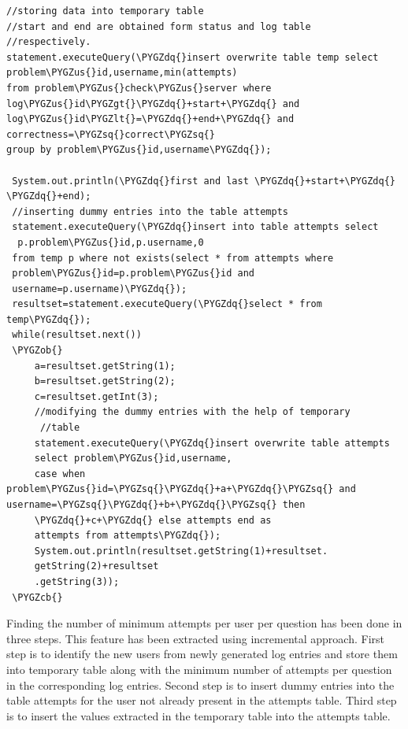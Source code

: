 \documentclass[a4paper,12pt,oneside]{sphinxmanual}
\def\PYGZus{\char`\_}
\def\PYGZob{\char`\{}
\def\PYGZcb{\char`\}}
\def\PYGZlt{\char`\<}
\def\PYGZgt{\char`\>}
\def\PYGZsq{\char`\'}
\def\PYGZdq{\char`\"}
\begin{document}
\begin{Verbatim}[commandchars=\\\{\}]
//storing data into temporary table
//start and end are obtained form status and log table
//respectively.
statement.executeQuery(\PYGZdq{}insert overwrite table temp select
problem\PYGZus{}id,username,min(attempts)
from problem\PYGZus{}check\PYGZus{}server where log\PYGZus{}id\PYGZgt{}\PYGZdq{}+start+\PYGZdq{} and
log\PYGZus{}id\PYGZlt{}=\PYGZdq{}+end+\PYGZdq{} and correctness=\PYGZsq{}correct\PYGZsq{}
group by problem\PYGZus{}id,username\PYGZdq{});

 System.out.println(\PYGZdq{}first and last \PYGZdq{}+start+\PYGZdq{} \PYGZdq{}+end);
 //inserting dummy entries into the table attempts
 statement.executeQuery(\PYGZdq{}insert into table attempts select
  p.problem\PYGZus{}id,p.username,0
 from temp p where not exists(select * from attempts where
 problem\PYGZus{}id=p.problem\PYGZus{}id and
 username=p.username)\PYGZdq{});
 resultset=statement.executeQuery(\PYGZdq{}select * from temp\PYGZdq{});
 while(resultset.next())
 \PYGZob{}
     a=resultset.getString(1);
     b=resultset.getString(2);
     c=resultset.getInt(3);
     //modifying the dummy entries with the help of temporary
      //table
     statement.executeQuery(\PYGZdq{}insert overwrite table attempts
     select problem\PYGZus{}id,username,
     case when problem\PYGZus{}id=\PYGZsq{}\PYGZdq{}+a+\PYGZdq{}\PYGZsq{} and username=\PYGZsq{}\PYGZdq{}+b+\PYGZdq{}\PYGZsq{} then
     \PYGZdq{}+c+\PYGZdq{} else attempts end as
     attempts from attempts\PYGZdq{});
     System.out.println(resultset.getString(1)+resultset.
     getString(2)+resultset
     .getString(3));
 \PYGZcb{}
\end{Verbatim}

Finding the number of minimum attempts per user per question has been done in three steps. This feature has been extracted using incremental approach. First step is to identify the new users from newly generated log entries and store them into temporary table along with the minimum number of attempts per question in the corresponding log entries. Second step is to insert dummy entries into the table attempts for the user not already present in the attempts table. Third step is to insert the values extracted in the temporary table into the attempts table.
\end{document}
